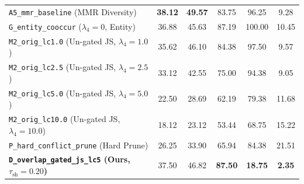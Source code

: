 \documentclass[11pt]{article}
\begin{document}
\begin{table}[t]
{\begin{tabular}{lccccc}
\texttt{A5\_mmr\_baseline} (MMR Diversity) & \textbf{38.12} & \textbf{49.57} & 83.75 & 96.25 & 9.28 \\
\texttt{G\_entity\_cooccur} ($\lambda_4=0$, Entity) & 36.88 & 45.63 & 87.19 & 100.00 & 10.45 \\
\texttt{M2\_orig\_lc1.0} (Un-gated JS, $\lambda_4=1.0$) & 35.62 & 46.10 & 84.38 & 97.50 & 9.57 \\
\texttt{M2\_orig\_lc2.5} (Un-gated JS, $\lambda_4=2.5$) & 33.12 & 42.55 & 75.00 & 94.38 & 9.05 \\
\texttt{M2\_orig\_lc5.0} (Un-gated JS, $\lambda_4=5.0$) & 22.50 & 28.69 & 62.19 & 79.38 & 11.68 \\
\texttt{M2\_orig\_lc10.0} (Un-gated JS, $\lambda_4=10.0$) & 18.12 & 23.12 & 53.44 & 68.75 & 15.22 \\
\texttt{P\_hard\_conflict\_prune} (Hard Prune) & 26.25 & 33.90 & 65.94 & 84.38 & 21.51 \\
\midrule
\textbf{\texttt{D\_overlap\_gated\_js\_lc5} (Ours, $\tau_{\text{sh}}=0.20$)} & 37.50 & 46.82 & \textbf{87.50} & \textbf{18.75} & \textbf{2.35} \\
\bottomrule
\end{tabular}
}
\end{table}
\end{document}
